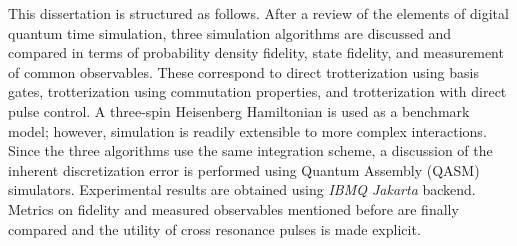This dissertation is structured as follows. After a review of the elements of digital quantum time simulation, three simulation algorithms are discussed and compared in terms of probability density fidelity, state fidelity, and measurement of common observables. These correspond to direct trotterization using basis gates, trotterization using commutation properties, and trotterization with direct pulse control. A three-spin Heisenberg Hamiltonian is used as a benchmark model; however, simulation is readily extensible to more complex interactions. Since the three algorithms use the same integration scheme, a discussion of the inherent discretization error is performed using Quantum Assembly (QASM) simulators. Experimental results are obtained using \textit{IBMQ Jakarta} backend. Metrics on fidelity and measured observables mentioned before are finally compared and the utility of cross resonance pulses is made explicit.